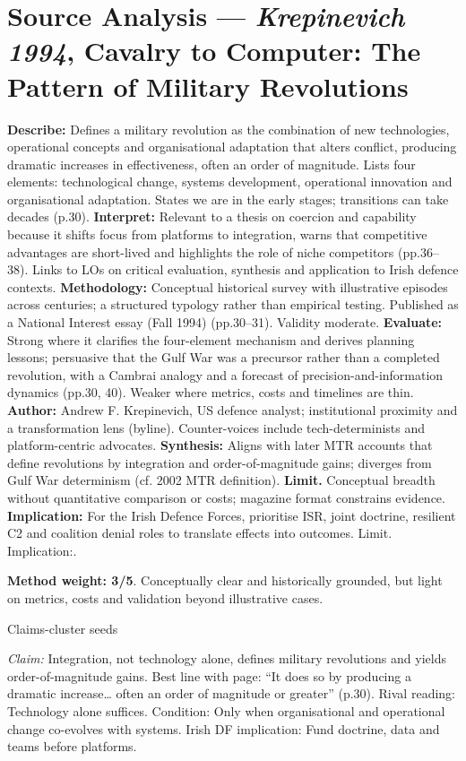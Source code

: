 \section*{Source Analysis — \textit{Krepinevich 1994}, Cavalry to Computer: The Pattern of Military Revolutions}
\textbf{Describe:} Defines a military revolution as the combination of new technologies, operational concepts and organisational adaptation that alters conflict, producing dramatic increases in effectiveness, often an order of magnitude. Lists four elements: technological change, systems development, operational innovation and organisational adaptation. States we are in the early stages; transitions can take decades (p.30).
\textbf{Interpret:} Relevant to a thesis on coercion and capability because it shifts focus from platforms to integration, warns that competitive advantages are short-lived and highlights the role of niche competitors (pp.36–38). Links to LOs on critical evaluation, synthesis and application to Irish defence contexts.
\textbf{Methodology:} Conceptual historical survey with illustrative episodes across centuries; a structured typology rather than empirical testing. Published as a National Interest essay (Fall 1994) (pp.30–31). Validity moderate.
\textbf{Evaluate:} Strong where it clarifies the four-element mechanism and derives planning lessons; persuasive that the Gulf War was a precursor rather than a completed revolution, with a Cambrai analogy and a forecast of precision-and-information dynamics (pp.30, 40). Weaker where metrics, costs and timelines are thin.
\textbf{Author:} Andrew F. Krepinevich, US defence analyst; institutional proximity and a transformation lens (byline). Counter-voices include tech-determinists and platform-centric advocates.
\textbf{Synthesis:} Aligns with later MTR accounts that define revolutions by integration and order-of-magnitude gains; diverges from Gulf War determinism (cf. 2002 MTR definition).
\textbf{Limit.} Conceptual breadth without quantitative comparison or costs; magazine format constrains evidence.
\textbf{Implication:} For the Irish Defence Forces, prioritise ISR, joint doctrine, resilient C2 and coalition denial roles to translate effects into outcomes. Limit. Implication:.

\textbf{Method weight: 3/5}. Conceptually clear and historically grounded, but light on metrics, costs and validation beyond illustrative cases.

Claims-cluster seeds

\textit{Claim:} Integration, not technology alone, defines military revolutions and yields order-of-magnitude gains.
Best line with page: “It does so by producing a dramatic increase… often an order of magnitude or greater” (p.30).
Rival reading: Technology alone suffices.
Condition: Only when organisational and operational change co-evolves with systems.
Irish DF implication: Fund doctrine, data and teams before platforms.

